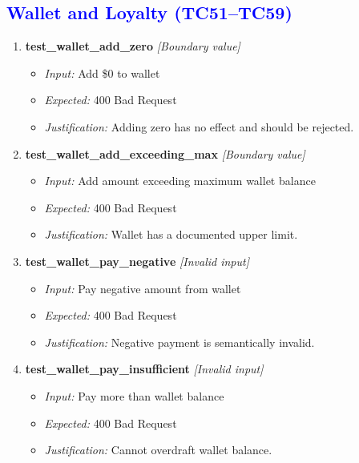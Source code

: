 \documentclass{article}
\begin{document}
\subsection*{\textcolor{blue}{Wallet and Loyalty (TC51--TC59)}}
\begin{enumerate}[resume, label=\textbf{TC\arabic*.}]

\item \textbf{test\_wallet\_add\_zero} \textit{[Boundary value]}
\begin{itemize}[noitemsep]
  \item \textit{Input:} Add \$0 to wallet
  \item \textit{Expected:} 400 Bad Request
  \item \textit{Justification:} Adding zero has no effect and should be rejected.
\end{itemize}

\item \textbf{test\_wallet\_add\_exceeding\_max} \textit{[Boundary value]}
\begin{itemize}[noitemsep]
  \item \textit{Input:} Add amount exceeding maximum wallet balance
  \item \textit{Expected:} 400 Bad Request
  \item \textit{Justification:} Wallet has a documented upper limit.
\end{itemize}

\item \textbf{test\_wallet\_pay\_negative} \textit{[Invalid input]}
\begin{itemize}[noitemsep]
  \item \textit{Input:} Pay negative amount from wallet
  \item \textit{Expected:} 400 Bad Request
  \item \textit{Justification:} Negative payment is semantically invalid.
\end{itemize}

\item \textbf{test\_wallet\_pay\_insufficient} \textit{[Invalid input]}
\begin{itemize}[noitemsep]
  \item \textit{Input:} Pay more than wallet balance
  \item \textit{Expected:} 400 Bad Request
  \item \textit{Justification:} Cannot overdraft wallet balance.
\end{itemize}


\end{enumerate}
\end{document}
